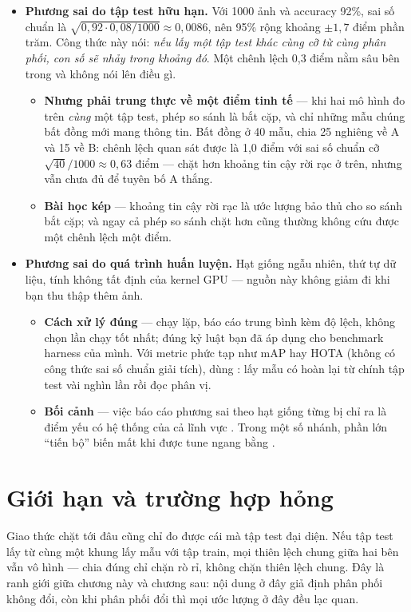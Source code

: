 \documentclass[../../deep_learning.tex]{subfiles}
\begin{document}
\begin{itemize}
\item \textbf{Phương sai do tập test hữu hạn.} Với 1000 ảnh và accuracy 92\%, sai số chuẩn là \(\sqrt{0{,}92\cdot 0{,}08/1000} \approx 0{,}0086\), nên  95\%
rộng khoảng \(\pm 1{,}7\) điểm phần trăm. Công thức này nói: \emph{nếu lấy một tập test khác cùng cỡ từ cùng phân phối, con số sẽ nhảy trong khoảng đó}. Một chênh lệch 0{,}3 điểm nằm sâu bên trong và không nói lên điều gì.
  \begin{itemize}
  \item \textbf{Nhưng phải trung thực về một điểm tinh tế} --- khi hai mô hình đo trên \emph{cùng} một tập test, phép so sánh là bắt cặp, và chỉ những mẫu chúng bất đồng mới mang thông tin. Bất đồng ở 40 mẫu, chia 25 nghiêng về A và 15 về B: chênh lệch quan sát được là 1{,}0 điểm với sai số chuẩn cỡ \(\sqrt{40}/1000 \approx 0{,}63\) điểm --- chặt hơn khoảng tin cậy rời rạc ở trên, nhưng vẫn chưa đủ để tuyên bố A thắng.
  \item \textbf{Bài học kép} --- khoảng tin cậy rời rạc là ước lượng bảo thủ cho so sánh bắt cặp; và ngay cả phép so sánh chặt hơn cũng thường không cứu được một chênh lệch một điểm.
  \end{itemize}
\item \textbf{Phương sai do quá trình huấn luyện.} Hạt giống ngẫu nhiên, thứ tự dữ liệu, tính không tất định của kernel GPU --- nguồn này không giảm đi khi bạn thu thập thêm ảnh.
  \begin{itemize}
  \item \textbf{Cách xử lý đúng} --- chạy lặp, báo cáo trung bình kèm độ lệch, không chọn lần chạy tốt nhất; đúng kỷ luật bạn đã áp dụng cho benchmark harness của mình. Với metric phức tạp như mAP hay HOTA (không có công thức sai số chuẩn giải tích), dùng : lấy mẫu có hoàn lại từ chính tập test vài nghìn lần rồi đọc phân vị.
  \item \textbf{Bối cảnh} --- việc báo cáo phương sai theo hạt giống từng bị chỉ ra là điểm yếu có hệ thống của cả lĩnh vực \cite{henderson2018deep}. Trong một số nhánh, phần lớn ``tiến bộ'' biến mất khi  được tune ngang bằng \cite{musgrave2020metric,dacrema2019worrying}.
  \end{itemize}
\end{itemize}

\section{Giới hạn và trường hợp hỏng}
Giao thức chặt tới đâu cũng chỉ đo được cái mà tập test đại diện. Nếu tập test lấy từ cùng một khung lấy mẫu với tập train, mọi thiên lệch chung giữa hai bên vẫn vô hình --- chia đúng chỉ chặn rò rỉ, không chặn thiên lệch chung. Đây là ranh giới giữa chương này và chương sau: nội dung ở đây giả định phân phối không đổi, còn khi phân phối đổi thì mọi ước lượng ở đây đều lạc quan.
\end{document}
